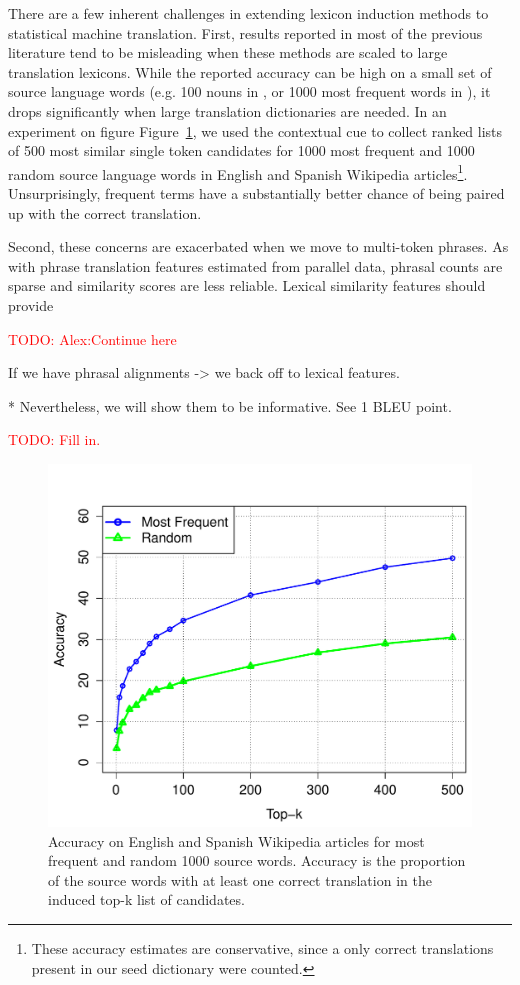 \documentclass[11pt]{article}
\newcommand{\todo}[1]{\textcolor{red}{TODO: #1}}
\newcommand{\figref}[1]{Figure~\ref{#1}}
\begin{document}
There are a few inherent challenges in extending lexicon induction methods to statistical machine translation.  First, results reported in most of the previous literature tend to be misleading when these methods are scaled to large translation lexicons.  While the reported accuracy can be high on a small set of source language words (e.g. 100 nouns in \cite{Rapp:1995}, or 1000 most frequent words in \cite{Koehn:2002}), it drops significantly when large translation dictionaries are needed.  In an experiment on figure \figref{fig:lexinduct}, we used the contextual cue to collect ranked lists of 500 most similar single token candidates for 1000 most frequent and 1000 random source language words in English and Spanish Wikipedia articles\footnote{These accuracy estimates are conservative, since a only correct translations present in our seed dictionary were counted.}.  Unsurprisingly, frequent terms have a substantially better chance of being paired up with the correct translation.

Second, these concerns are exacerbated when we move to multi-token phrases.  As with phrase translation features estimated from parallel data, phrasal counts are sparse and similarity scores are less reliable.  Lexical similarity features should provide  

\todo{Alex:Continue here}

If we have phrasal alignments -> we back off to lexical features.

* Nevertheless, we will show them to be informative.  See 1 BLEU point.

\todo{Fill in.}

\begin{figure}[t]
\begin{center}
\includegraphics[width=\linewidth]{../figures/lexinduct/lexinduct.pdf}
\caption{Accuracy on English and Spanish Wikipedia articles for most frequent and random 1000 source words.  Accuracy is the proportion of the source words with at least one correct translation in the induced top-k list of candidates.}
\label{fig:lexinduct}
\end{center}
\vskip -0.2in
\end{figure}
\end{document}

